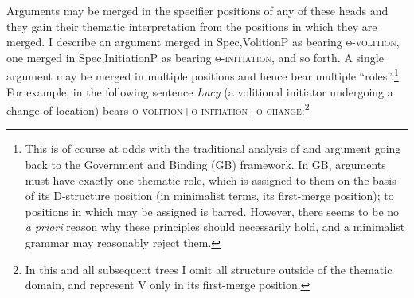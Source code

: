 \documentclass[output=paper]{langsci/langscibook}
\begin{document}
\ea
\z
Arguments may be merged in the specifier positions of any of these heads and
they gain their thematic interpretation from the positions in which they are
merged. I describe an argument merged in Spec,VolitionP as bearing
\textsc{θ-volition}, one merged  in Spec,InitiationP as bearing
\textsc{θ-initiation}, and so forth. A single argument may be merged in
multiple positions and hence bear multiple \enquote{roles}.\footnote{This is of
    course at odds with the traditional analysis of  and argument
     going back to the Government and Binding (\gls{GB}) framework. In \gls{GB},
    arguments must have exactly one thematic role, which is assigned to them on
    the basis of its D-structure position (in minimalist terms, its first-merge
    position);  to positions in which  may be assigned is
barred. However, there seems to be no \emph{a priori} reason why these
principles should necessarily hold, and a minimalist grammar may reasonably
reject them.} For example, in the following sentence \emph{Lucy} (a volitional
initiator undergoing a change of location) bears
\textsc{θ-volition+θ-initiation+θ-change}:\footnote{In this and all subsequent
trees I omit all structure outside of the thematic domain, and represent V only
in its first-merge position.}
\end{document}
